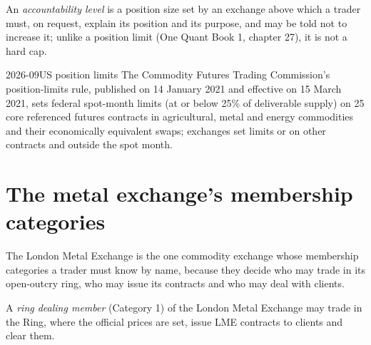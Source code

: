 \begin{definition}\label{def:m3:getting-access-commodities-and-power:accountability}
An \emph{accountability level} is a position size set by an exchange above
which a trader must, on request, explain its position and its purpose, and may be told not to increase
it; unlike a position limit (One Quant Book 1, chapter 27), it is not a hard cap.
\end{definition}

\begin{dated}{2026-09}{US position limits}\label{dat:m3:getting-access-commodities-and-power:limits}
The Commodity Futures Trading Commission's position-limits rule, published on 14 January 2021 and effective
on 15 March 2021, sets federal spot-month limits (at or below 25\% of deliverable supply) on 25 core
referenced futures contracts in agricultural, metal and energy commodities and their economically
equivalent swaps; exchanges set limits or  on other contracts and outside the spot month.
\end{dated}

\section{The metal exchange's membership categories}

The London Metal Exchange is the one commodity exchange whose membership categories a trader must know
by name, because they decide who may trade in its open-outcry ring, who may issue its contracts and who may
deal with clients.

\begin{definition}\label{def:m3:getting-access-commodities-and-power:ring}
A \emph{ring dealing member} (Category 1) of the London Metal Exchange may trade
in the Ring, where the official prices are set, issue LME contracts to clients and clear them.
\end{definition}

